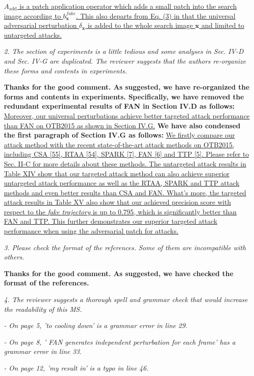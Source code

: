 \documentclass[12pt]{article}
\begin{document}
\uline{$A_{\text{add}}$ is a patch application operator which adds a small patch into the search image according to $b^{fake}_{\textbf{x}}$. This also departs from Eq. (3) in that the universal adversarial perturbation $\delta_\textbf{x}$ is added to the whole search image $\textbf{x}$ and limited to untargeted attacks.}

\textit{2. The section of experiments is a little tedious and some analyses in Sec. IV-D and Sec. IV-G are duplicated. The reviewer suggests that the authors re-organize these forms and contents in experiments.}

\textbf{Thanks for the good comment. As suggested, we have re-organized the forms and contents in experiments. Specifically, we have removed the redundant experimental results of FAN in Section IV.D as follows:} \uline{Moreover, our universal perturbations achieve better targeted attack performance than FAN on OTB2015 as shown in Section IV.G.} \textbf{We have also condensed the first paragraph of Section IV.G as follows:} \uline{We firstly compare our attack method with the recent state-of-the-art attack methods on OTB2015, including CSA [55], RTAA [54], SPARK [7], FAN [6] and TTP [5]. Please refer to Sec. II-C for more details about these methods. The untargeted attack results in Table XIV show that our targeted attack method can also achieve superior untargeted attack performance as well as the RTAA, SPARK and TTP attack methods and even better results than CSA and FAN. What’s more, the targeted attack results in Table XV also show that our achieved precision score with respect to the \textit{fake trajectory} is up to 0.795, which is significantly better than FAN and TTP. This further demonstrates our superior targeted attack performance when using the adversarial patch for attacks.}

\textit{3. Please check the format of the references. Some of them are incompatible with others.}

\textbf{Thanks for the good comment. As suggested, we have checked the format of the references.}

\textit{4. The reviewer suggests a thorough spell and grammar check that would increase the readability of this MS.}

\textit{- On page 5, 'to cooling down' is a grammar error in line 29.}

\textit{- On page 8, ' FAN generates independent perturbation for each frame' has a grammar error in line 33.}

\textit{- On page 12, 'my result in' is a typo in line 46.}
\end{document}
